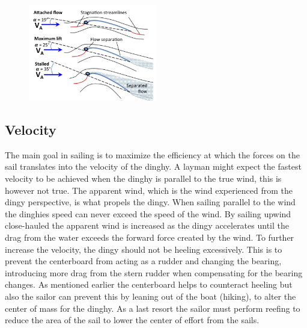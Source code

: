 \begin{figure}[H]
\centering
\includegraphics[width=0.5\textwidth]{Figures/max_lift.jpg}
\label{max_liftl}
\end{figure}
\subsection{Velocity}
The main goal in sailing is to maximize the efficiency at which the forces on the sail translates into the velocity of the dinghy. A layman might expect the fastest velocity to be achieved when the dinghy is parallel to the true wind, this is however not true. The apparent wind, which is the wind experienced from the dingy perspective, is what propels the dingy. When sailing parallel to the wind the dinghies speed can never exceed the speed of the wind\cite{sail-force}. By sailing upwind close-hauled the apparent wind is increased as the dingy accelerates until the drag from the water exceeds the forward force created by the wind. To further increase the velocity, the dingy should not be heeling excessively. This is to prevent the centerboard from acting as a rudder and changing the bearing, introducing more drag from the stern rudder when compensating for the bearing changes. As mentioned earlier the centerboard helps to counteract heeling but also the sailor can prevent this by leaning out of the boat (hiking), to alter the center of mass for the dinghy. As a last resort the sailor must perform reefing to reduce the area of the sail to lower the center of effort from the sails.
